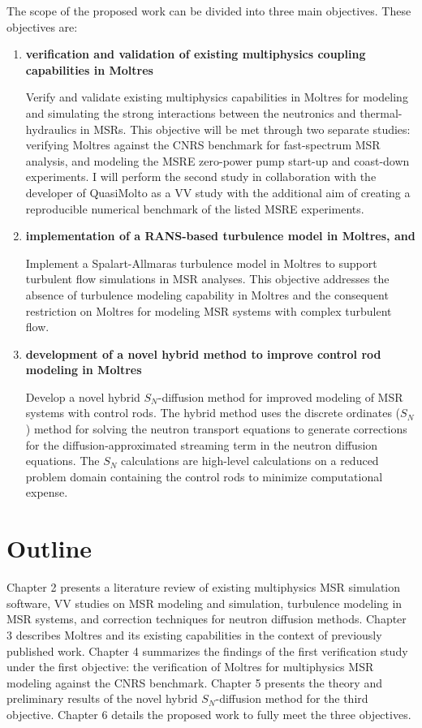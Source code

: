 The scope of the proposed work can be divided into three main objectives. These objectives are:
%
\begin{enumerate}[itemindent=20pt, listparindent=1.5em, label=\textbf{\arabic*}]
  \item \textbf{verification and validation of existing multiphysics coupling capabilities in
    Moltres}

    Verify and validate existing multiphysics capabilities in Moltres for modeling and simulating
    the strong interactions between the neutronics and thermal-hydraulics in \glspl{MSR}. This
    objective will be met through two separate studies: verifying Moltres against the CNRS
    benchmark \cite{tiberga_results_2020} for fast-spectrum \gls{MSR} analysis, and modeling the
    \gls{MSRE} zero-power pump start-up and coast-down experiments. I will perform the second study
    in collaboration with the developer of QuasiMolto \cite{reynolds_analysis_2023} as a \gls{VV}
    study with the additional aim of creating a reproducible numerical benchmark of the listed
    \gls{MSRE} experiments.

  \item \textbf{implementation of a \gls{RANS}-based turbulence model in Moltres, and}

    Implement a Spalart-Allmaras turbulence model in Moltres to support turbulent flow simulations
    in \gls{MSR} analyses. This objective addresses the absence of turbulence modeling capability
    in Moltres and the consequent restriction on Moltres for modeling \gls{MSR} systems with
    complex turbulent flow.

  \item \textbf{development of a novel hybrid method to improve control rod modeling in Moltres}

    Develop a novel hybrid $S_N$-diffusion method for improved modeling of \gls{MSR} systems with
    control rods. The hybrid method uses the discrete ordinates ($S_N$) method for solving the
    neutron transport equations to generate corrections for the diffusion-approximated streaming
    term in the neutron diffusion equations. The $S_N$ calculations are high-level
    calculations on a reduced problem domain containing the control rods to minimize computational
    expense.
\end{enumerate}

\section{Outline}

Chapter 2 presents a literature review of existing multiphysics \gls{MSR} simulation software,
\gls{VV} studies on \gls{MSR} modeling and simulation, turbulence modeling in \gls{MSR} systems,
and correction techniques for neutron diffusion methods.
Chapter 3 describes Moltres and its existing capabilities in the context of previously published
work.
Chapter 4 summarizes the findings of the first verification study under the first objective: the
verification of Moltres for multiphysics \gls{MSR} modeling against the CNRS benchmark.
Chapter 5 presents the theory and preliminary results of the novel hybrid $S_N$-diffusion
method for the third objective.
Chapter 6 details the proposed work to fully meet the three objectives.
